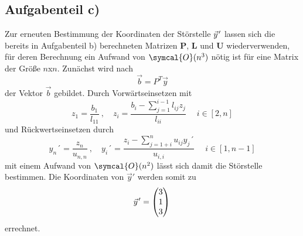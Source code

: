 \subsection*{Aufgabenteil c)}
Zur erneuten Bestimmung der Koordinaten der Störstelle $\pvec{y}'$ lassen sich die bereits
in Aufgabenteil b) berechneten Matrizen $\symbf{P}$, $\symbf{L}$ und $\symbf{U}$ wiederverwenden, für deren Berechnung ein Aufwand von $\symcal{O}(n^3)$ nötig ist für eine Matrix der Größe $n$x$n$. Zunächst wird nach
\begin{equation}
  \vec{b} = P^{T} \vec{y}
\end{equation}
der Vektor $\vec{b}$ gebildet.
Durch Vorwärtseinsetzen mit
\begin{equation}
   z_1=\frac{b_1}{l_{11}} \: , \quad z_i=\frac{b_i-\sum_{j=1}^{i-1}l_{ij}z_j}{l_{ii}}\; \quad i \in [2,n]
\end{equation}
und Rückwertseinsetzen durch
\begin{equation}
  y_n´=\frac{z_n}{u_{n,n}} \: , \quad y_i´=\frac{z_i-\sum_{j=1+i}^{n}u_{ij}y_j´}{u_{i,i}}\; \quad i \in [1,n-1]
\end{equation}
mit einem Aufwand von $\symcal{O}(n^2)$ %
lässt sich damit die Störstelle bestimmen.
Die Koordinaten von $\vec{y}'$ werden somit zu
\begin{equation*}
  \pvec{y}'=
  \begin{pmatrix}
    3 \\
    1 \\
    3 \\
  \end{pmatrix} \\
\end{equation*}
errechnet.


